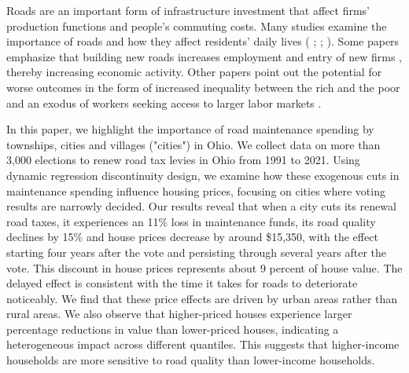 Roads are an important form of infrastructure investment that affect firms’ production functions and people’s commuting costs. Many studies examine the importance of roads and how they affect residents' daily lives ( \citeyear{currier2023};  \citeyear{adukia2020};  \citeyear{asher2020}). Some papers emphasize that building new roads increases employment and entry of new firms \citep{gibbons2019new}, thereby increasing economic activity. Other papers point out the potential for worse outcomes in the form of increased inequality between the rich and the poor \citep{hettige2006} and an exodus of workers seeking access to larger labor markets \citep{asher2020}.  
 
In this paper, we highlight the importance of road maintenance spending by townships, cities and villages ("cities") in Ohio. We collect data on more than 3,000 elections to renew road tax levies in Ohio from 1991 to 2021. Using dynamic regression discontinuity design, we examine how these exogenous cuts in maintenance spending influence housing prices, focusing on cities where voting results are narrowly decided. Our results reveal that when a city cuts its renewal road taxes, it experiences an 11\% loss in maintenance funds, its road quality declines by 15\% and house prices decrease by around \$15,350, with the effect starting four years after the vote and persisting through several years after the vote. This discount in house prices represents about 9 percent of house value. The delayed effect is consistent with the time it takes for roads to deteriorate noticeably. We find that these price effects are driven by urban areas rather than rural areas. We also observe that higher-priced houses experience larger percentage reductions in value than lower-priced houses, indicating a heterogeneous impact across different quantiles. This suggests that higher-income households are more sensitive to road quality than lower-income households. 


